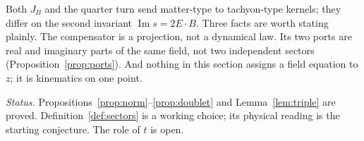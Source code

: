 Both \(J_B\) and the quarter turn send matter-type to tachyon-type kernels; they differ on the second invariant
\(\operatorname{Im}s=2E\cdot B\).  Three facts are worth stating plainly.  The compensator is a projection, not a dynamical
law.  Its two ports are real and imaginary parts of the same field, not two independent sectors (Proposition~\ref{prop:ports}).
And nothing in this section assigns a field equation to \(z\); it is kinematics on one point.

\medskip\noindent\emph{Status.}  Propositions~\ref{prop:norm}--\ref{prop:doublet} and Lemma~\ref{lem:triple} are proved.
Definition~\ref{def:sectors} is a working choice; its physical reading is the starting conjecture.  The role of \(t\) is open.
